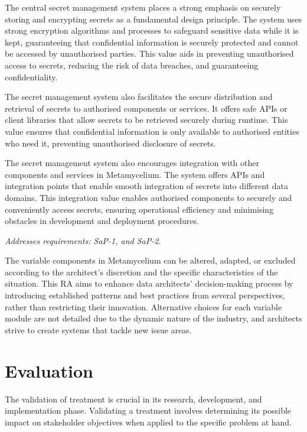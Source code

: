 \documentclass[journal]{IEEEtran}
\begin{document}
\begin{enumerate}
    The central secret management system places a strong emphasis on securely storing and encrypting secrets as a fundamental design principle. The system uses strong encryption algorithms and processes to safeguard sensitive data while it is kept, guaranteeing that confidential information is securely protected and cannot be accessed by unauthorised parties. This value aids in preventing unauthorised access to secrets, reducing the risk of data breaches, and guaranteeing confidentiality.
    
    The secret management system also facilitates the secure distribution and retrieval of secrets to authorised components or services. It offers safe APIs or client libraries that allow secrets to be retrieved securely during runtime. This value ensures that confidential information is only available to authorised entities who need it, preventing unauthorised disclosure of secrets.
    
    The secret management system also encourages integration with other components and services in Metamycelium. The system offers APIs and integration points that enable smooth integration of secrets into different data domains. This integration value enables authorised components to securely and conveniently access secrets, ensuring operational efficiency and minimising obstacles in development and deployment procedures.
    
    \textit{Addresses requirements: SaP-1, and SaP-2.} 

\end{enumerate}

The variable components in Metamycelium can be altered, adapted, or excluded according to the architect's discretion and the specific characteristics of the situation. This RA aims to enhance data architects' decision-making process by introducing established patterns and best practices from several perspectives, rather than restricting their innovation. Alternative choices for each variable module are not detailed due to the dynamic nature of the industry, and architects strive to create systems that tackle new issue areas. 

\section{Evaluation}
\label{sec:discussion}

The validation of treatment is crucial in its research, development, and implementation phase. Validating a treatment involves determining its possible impact on stakeholder objectives when applied to the specific problem at hand. 
\end{document}
